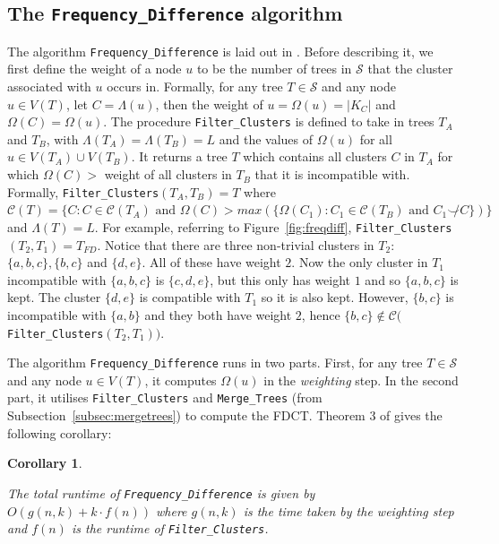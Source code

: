 \documentclass{article}
\newcommand{\compatible}{\smile}
\newcommand{\leafset}{\Lambda}
\newtheorem{freqdiffruntimecomponents}[incompatibility]{Corollary}
\begin{document}
    \subsection{The \texttt{Frequency\_Difference} algorithm}
    The algorithm \texttt{Frequency\_Difference} is laid out in \cite{jansson2018algorithms}. Before describing it, we first define the weight of a node $u$ to be the number of trees in $\mathcal{S}$ that the cluster associated with $u$ occurs in. Formally, for any tree $T \in \mathcal{S}$ and any node $u \in V(T)$, let $C = \leafset(u)$, then the weight of $u = \Omega(u) = |K_C|$ and $\Omega(C) = \Omega(u)$. The procedure \texttt{Filter\_Clusters} is defined to take in trees $T_A$ and $T_B$, with $\leafset(T_A) = \leafset(T_B) = L$ and the values of $\Omega(u)$ for all $u \in V(T_A) \cup V(T_B)$. It returns a tree $T$ which contains all clusters $C$ in $T_A$ for which $\Omega(C) > $ weight of all clusters in $T_B$ that it is incompatible with. Formally, \texttt{Filter\_Clusters}$(T_A, T_B) = T$ where $\mathcal{C}(T) = \{C : C \in \mathcal{C}(T_A) \text{ and } \Omega(C) > max(\{\Omega(C_1) : C_1 \in \mathcal{C}(T_B) \text{ and } C_1 \not\compatible C\})\}$ and $\leafset(T) = L$. For example, referring to Figure~\ref{fig:freqdiff}, \texttt{Filter\_Clusters}$(T_2, T_1) = T_{FD}$. Notice that there are three non-trivial clusters in $T_2$: $\{a, b, c\}, \{b, c\}$ and $\{d, e\}$. All of these have weight $2$. Now the only cluster in $T_1$ incompatible with $\{a, b, c\}$ is $\{c, d, e\}$, but this only has weight $1$ and so $\{a, b, c\}$ is kept. The cluster $\{d, e\}$ is compatible with $T_1$ so it is also kept. However, $\{b, c\}$ is incompatible with $\{a, b\}$ and they both have weight $2$, hence $\{b, c\} \not\in \mathcal{C}($\texttt{Filter\_Clusters}$(T_2, T_1))$.

    The algorithm \texttt{Frequency\_Difference} runs in two parts. First, for any tree $T \in \mathcal{S}$ and any node $u \in V(T)$, it computes $\Omega(u)$ in the \textit{weighting} step. In the second part, it utilises \texttt{Filter\_Clusters} and \texttt{Merge\_Trees} (from Subsection~\ref{subsec:mergetrees}) to compute the FDCT. Theorem 3 of \cite{jansson2018algorithms} gives the following corollary:
    \newline

    \begin{freqdiffruntimecomponents}
        \label{cor:freqdiffruntimecomponents}

        The total runtime of \texttt{Frequency\_Difference} is given by $O(g(n, k) + k \cdot f(n))$ where $g(n, k)$ is the time taken by the weighting step and $f(n)$ is the runtime of \texttt{Filter\_Clusters}.
    \end{freqdiffruntimecomponents}
\end{document}
